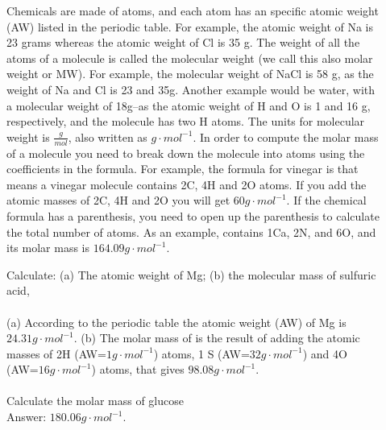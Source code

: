 \documentclass[main.tex]{subfiles}
\begin{document}
\begin{description}
\item[] Chemicals are made of atoms, and each atom has an specific atomic weight (AW) listed in the periodic table. For example, the atomic weight of Na is 23 grams whereas the atomic weight of Cl is 35 g. The weight of all the atoms of a molecule is called the molecular weight (we call this also molar weight or MW). For example, the molecular weight of NaCl is 58 g, as the weight of Na and Cl is 23 and 35g. Another example would be water,  with a molecular weight of 18g--as the atomic weight of H and O is 1 and 16 g, respectively, and the molecule has two H atoms. The units for molecular weight is $\frac{g}{mol}$, also written as $g\cdot mol^{-1}$. In order to compute the molar mass of a molecule you need to break down the molecule into atoms using the coefficients in the formula. For example, the formula for vinegar is  that means a vinegar molecule contains 2C, 4H and 2O atoms. If you add the atomic masses of 2C, 4H and 2O you will get $60g\cdot mol^{-1}$. If the chemical formula has a parenthesis, you need to open up the parenthesis to calculate the total number of atoms. As an example,  contains 1Ca, 2N, and 6O, and its molar mass is $164.09g\cdot mol^{-1}$.

\begin{example} %
Calculate: (a) The atomic weight of Mg; (b) the molecular mass of sulfuric acid,  \\
\\
(a) According to the periodic table the atomic weight (AW) of Mg is $24.31g\cdot mol^{-1}$. (b) The molar mass of  is the result of adding the atomic masses of 2H (AW=$1g\cdot mol^{-1}$) atoms, 1 S (AW=$32g\cdot mol^{-1}$) and 4O (AW=$16g\cdot mol^{-1}$)  atoms, that gives $98.08g\cdot mol^{-1}$.\\
\faDiamond\ \\
Calculate the molar mass of glucose \\
\flushright Answer: $180.06g\cdot mol^{-1}$.
\end{example}%




\end{description}
\end{document}

